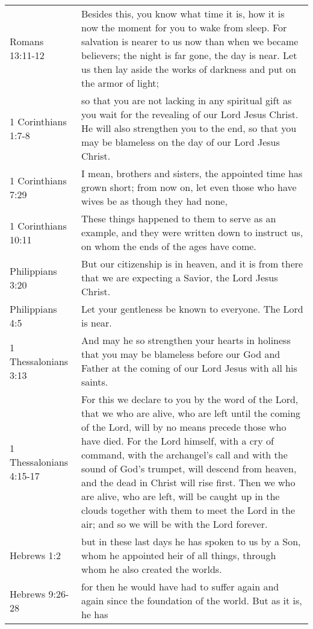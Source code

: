 \begin{table}
    \footnotesize
    \begin{center}
        \begin{tabulary}{\linewidth}{lL}
            \toprule
Romans 13:11-12 & Besides 
this, you know what time it is, how it is now the moment for you to wake from 
sleep. For salvation is nearer to us now than when we became believers; the 
night is far gone, the day is near. Let us then lay aside the works of darkness 
and put on the armor of light; \\
1 Corinthians 1:7-8 & so that you are not lacking 
in any spiritual gift as you wait for the revealing of our Lord Jesus Christ. 
He will also strengthen you to the end, so that you may be blameless on the 
day of our Lord Jesus Christ. \\
1 Corinthians 7:29 & I mean, brothers and sisters, 
the appointed time has grown short; from now on, let even those who have wives 
be as though they had none, \\
1 Corinthians 10:11 & These things happened to them 
to serve as an example, and they were written down to instruct us, on whom the 
ends of the ages have come. \\
Philippians 3:20 & But our citizenship is in heaven, 
and it is from there that we are expecting a Savior, the Lord Jesus Christ. \\
Philippians 4:5 & Let your gentleness be known to everyone. The Lord is 
near. \\
1 Thessalonians 3:13 &
And may he so strengthen your hearts in holiness that you may be blameless 
before our God and Father at the coming of our Lord Jesus with all his saints. \\
1 Thessalonians 4:15-17 & For this we declare to you by the word of the 
Lord, that we who are 
alive, who are left until the coming of the Lord, will by no means precede 
those who have died. For the Lord himself, with a cry of command, with 
the archangel's call and with the sound of God's trumpet, will descend from 
heaven, and the dead in Christ will rise first. Then we who are alive, who are 
left, will be caught up in the clouds together with them to meet the Lord in 
the air; and so we will be with the Lord forever. \\
Hebrews 1:2 & but in these 
last days he has spoken to us by a Son, whom he appointed heir of all things, 
through whom he also created the worlds. \\
Hebrews 9:26-28 & for then he would have had to 
suffer again and again since the foundation of the world. But as it is, he has 

\end{tabulary}
\end{center}
\end{table}
